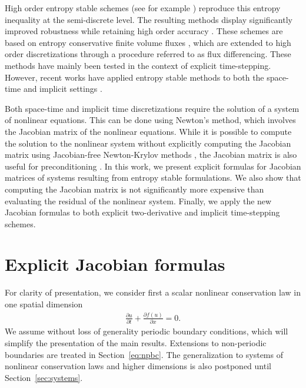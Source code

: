 \documentclass{article}
\newcommand{\pd}[2]{\frac{\partial#1}{\partial#2}}
\newcommand{\LRp}[1]{\left( #1 \right)}
\newcommand{\note}[1]{{\color{blue}{#1}}}
\newcommand{\eqlab}[1]{\begin{align}#1\end{align}}
\begin{document}
High order entropy stable schemes (see for example \cite{carpenter2014entropy, gassner2016split, chen2017entropy, crean2018entropy, chan2017discretely}) reproduce this entropy inequality at the semi-discrete level.  The resulting methods display significantly improved robustness while retaining high order accuracy \cite{winters2018comparative, rojas2019robustness}.  These schemes are based on entropy conservative finite volume fluxes \cite{tadmor1987numerical}, which are extended to high order discretizations through a procedure referred to as flux differencing.  These methods have mainly been tested in the context of explicit time-stepping.  However, recent works have applied entropy stable methods to both the space-time and implicit settings \cite{friedrich2018entropy, hicken2020entropy}.  

Both space-time and implicit time discretizations require the solution of a system of nonlinear equations.  This can be done using Newton's method, which involves the Jacobian matrix of the nonlinear equations.  While it is possible to compute the solution to the nonlinear system without explicitly computing the Jacobian matrix using Jacobian-free Newton-Krylov methods \cite{knoll2004jacobian, birken2019subcell}, the Jacobian matrix is also useful for preconditioning \cite{persson2006efficient, persson2008newton}.  In this work, we present explicit formulas for Jacobian matrices of systems resulting from entropy stable formulations.  We also show that computing the Jacobian matrix is not significantly more expensive than evaluating the residual of the nonlinear system.  Finally, we apply the new Jacobian formulas to both explicit two-derivative and implicit time-stepping schemes.


\section{Explicit Jacobian formulas}

For clarity of presentation, we consider first a scalar nonlinear conservation law in one spatial dimension
\eqlab{
\pd{u}{t} + \pd{f(u)}{x} = 0. \label{eq:ncl}
}
We assume without loss of generality periodic boundary conditions, which will simplify the presentation of the main results.  Extensions to non-periodic boundaries are treated in Section~\ref{eq:npbc}.  The generalization to systems of nonlinear conservation laws and higher dimensions is also postponed until Section~\ref{sec:systems}.  
\end{document}
